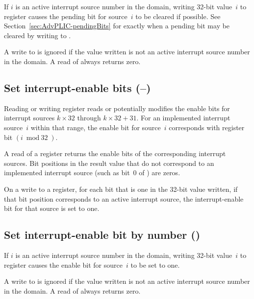If $i$ is an active interrupt source number in the domain, writing
\mbox{32-bit} value~$i$ to register  causes the pending bit
for source~$i$ to be cleared if possible.
See Section~\ref{sec:AdvPLIC-pendingBits} for exactly when a pending
bit may be cleared by writing to .

A write to  is ignored if the value written is not an
active interrupt source number in the domain.
A read of  always returns zero.

\subsection{%
Set interrupt-enable bits (--)%
}

Reading or writing register  reads or potentially
modifies the enable bits for interrupt sources $k\times\mbox{32}$
through ${k\times\mbox{32}+\mbox{31}}$.
For an implemented interrupt source~$i$ within that range, the enable
bit for source~$i$ corresponds with register bit ${(i\bmod\mbox{32})}$.

A read of a  register returns the enable bits of the
corresponding interrupt sources.
Bit positions in the result value that do not correspond to an
implemented interrupt source (such as bit~0 of ) are
zeros.

On a write to a  register, for each bit that is one in the
\mbox{32-bit} value written, if that bit position corresponds to an
active interrupt source, the interrupt-enable bit for that source is
set to one.

\subsection{Set interrupt-enable bit by number ()}

If $i$ is an active interrupt source number in the domain, writing
\mbox{32-bit} value~$i$ to register  causes the enable bit
for source~$i$ to be set to one.

A write to  is ignored if the value written is not an
active interrupt source number in the domain.
A read of  always returns zero.

